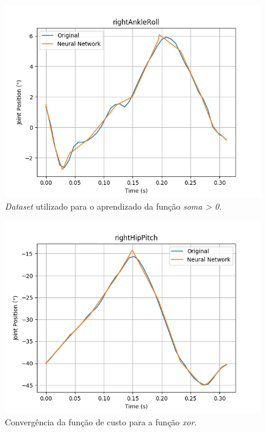 \documentclass[conference]{IEEEtran}
\begin{document}
\begin{figure}[htbp]
\centering
\centerline{\includegraphics[scale=0.5]{imagens/imitation_learning/rightAnkleRoll.png}}
\caption{\textit{Dataset} utilizado para o aprendizado da função \textit{soma > 0}.}
\label{imitation_learning/rightAnkleRoll}
\end{figure}

\begin{figure}[htbp]
\centering
\centerline{\includegraphics[scale=0.5]{imagens/imitation_learning/rightHipPitch.png}}
\caption{Convergência da função de custo para a função \textit{xor}.}
\label{imitation_learning/rightHipPitch}
\end{figure}
\end{document}
